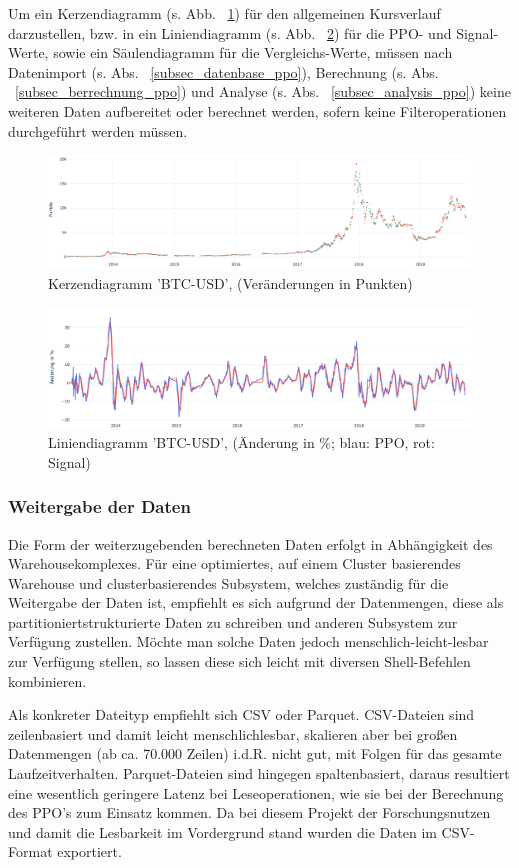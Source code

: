 Um ein Kerzendiagramm (s. Abb. ~\ref{graph_btcusd_ppo_2}) für den allgemeinen Kursverlauf darzustellen, bzw. in ein Liniendiagramm (s. Abb. ~\ref{graph_btcusd_ppo_1}) für die PPO- und Signal-Werte, sowie ein Säulendiagramm für die Vergleichs-Werte, müssen nach Datenimport (s. Abs. ~\ref{subsec_datenbase_ppo}), Berechnung (s. Abs. ~\ref{subsec_berrechnung_ppo}) und Analyse (s. Abs. ~\ref{subsec_analysis_ppo}) keine weiteren Daten aufbereitet oder berechnet werden, sofern keine Filteroperationen durchgeführt werden müssen.

\begin{figure}[!htb]
\includegraphics[width=.5\textwidth,keepaspectratio]{ppo/graph_btcusd_ppo_2}
\caption{Kerzendiagramm 'BTC-USD', (Veränderungen in Punkten)}
\label{graph_btcusd_ppo_2}
\end{figure}

\begin{figure}[!htb]
\includegraphics[width=.5\textwidth,keepaspectratio]{ppo/graph_btcusd_ppo_1}
\caption{Liniendiagramm 'BTC-USD', (Änderung in \%; blau: PPO, rot: Signal)}
\label{graph_btcusd_ppo_1}
\end{figure}

\subsubsection{Weitergabe der Daten}
Die Form der weiterzugebenden berechneten Daten erfolgt in Abhängigkeit des Warehousekomplexes. Für eine optimiertes, auf einem Cluster basierendes Warehouse und clusterbasierendes Subsystem, welches zuständig für die Weitergabe der Daten ist, empfiehlt es sich aufgrund der Datenmengen, diese als partitioniertstrukturierte Daten zu schreiben und anderen Subsystem zur Verfügung zustellen. Möchte man solche Daten jedoch menschlich-leicht-lesbar zur Verfügung stellen, so lassen diese sich leicht mit diversen Shell-Befehlen kombinieren.

Als konkreter Dateityp empfiehlt sich CSV oder Parquet. CSV-Dateien sind zeilenbasiert und damit leicht menschlichlesbar, skalieren aber bei großen Datenmengen (ab ca. 70.000 Zeilen) i.d.R. nicht gut, mit Folgen für das gesamte Laufzeitverhalten. Parquet-Dateien sind hingegen spaltenbasiert, daraus resultiert eine wesentlich geringere Latenz bei Leseoperationen, wie sie bei der Berechnung des PPO's zum Einsatz kommen. Da bei diesem Projekt der Forschungsnutzen und damit die Lesbarkeit im Vordergrund stand wurden die Daten im CSV-Format exportiert.

